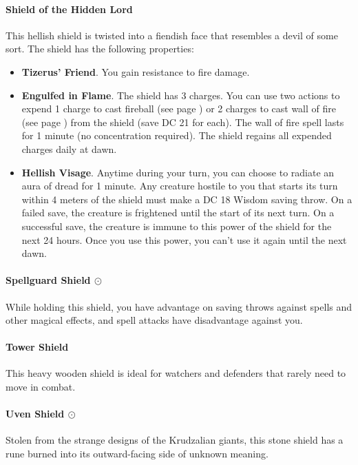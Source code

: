     \paragraph{Shield of the Hidden Lord}
        This hellish shield is twisted into a fiendish face that resembles a devil of some sort.
        The shield has the following properties:
        \begin{itemize}
            \item \textbf{Tizerus' Friend}.
            You gain resistance to fire damage.
            \item \textbf{Engulfed in Flame}.
            The shield has 3 charges.
            You can use two actions to expend 1 charge to cast fireball (see page \pageref{spell:fireball}) or 2 charges to cast wall of fire (see page \pageref{spell:walloffire}) from the shield (save DC 21 for each).
            The wall of fire spell lasts for 1 minute (no concentration required).
            The shield regains all expended charges daily at dawn.
            \item \textbf{Hellish Visage}.
            Anytime during your turn, you can choose to radiate an aura of dread for 1 minute.
            Any creature hostile to you that starts its turn within 4 meters of the shield must make a DC 18 Wisdom saving throw.
            On a failed save, the creature is frightened until the start of its next turn.
            On a successful save, the creature is immune to this power of the shield for the next 24 hours.
            Once you use this power, you can't use it again until the next dawn.
        \end{itemize}
    \paragraph{Spellguard Shield $\odot$}
        While holding this shield, you have advantage on saving throws against spells and other magical effects, and spell attacks have disadvantage against you.
    \paragraph{Tower Shield}
        This heavy wooden shield is ideal for watchers and defenders that rarely need to move in combat.
    \paragraph{Uven Shield $\odot$}
        Stolen from the strange designs of the Krudzalian giants, this stone shield has a rune burned into its outward-facing side of unknown meaning.

